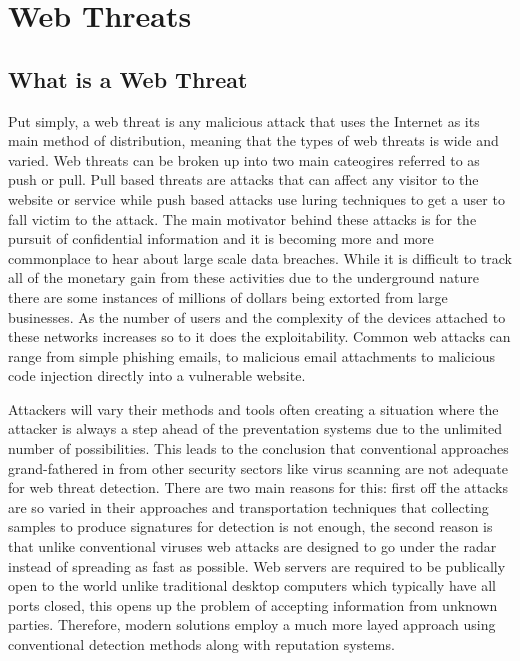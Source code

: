 \chapter{Web Threats}
\section{What is a Web Threat}

Put simply, a web threat is any malicious attack that uses the Internet as its main method of distribution, meaning that the types of web threats is wide and varied.  Web threats can be broken up into two main cateogires referred to as push or pull.  Pull based threats are attacks that can affect any visitor to the website or service while push based attacks use luring techniques to get a user to fall victim to the attack.  The main motivator behind these attacks is for the pursuit of confidential information and it is becoming more and more commonplace to hear about large scale data breaches.  While it is difficult to track all of the monetary gain from these activities due to the underground nature there are some instances of millions of dollars being extorted from large businesses.  As the number of users and the complexity of the devices attached to these networks increases so to it does the exploitability.  Common web attacks can range from simple phishing emails, to malicious email attachments to malicious code injection directly into a vulnerable website.

Attackers will vary their methods and tools often creating a situation where the attacker is always a step ahead of the preventation systems due to the unlimited number of possibilities.  This leads to the conclusion that conventional approaches grand-fathered in from other security sectors like virus scanning are not adequate for web threat detection.  There are two main reasons for this: first off the attacks are so varied in their approaches and transportation techniques that collecting samples to produce signatures for detection is not enough, the second reason is that unlike conventional viruses web attacks are designed to go under the radar instead of spreading as fast as possible.  Web servers are required to be publically open to the world unlike traditional desktop computers which typically have all ports closed, this opens up the problem of accepting information from unknown parties.  Therefore, modern solutions employ a much more layed approach using conventional detection methods along with reputation systems.

